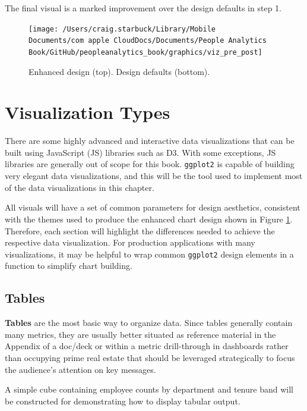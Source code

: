 \documentclass[
]{book}
\begin{document}
The final visual is a marked improvement over the design defaults in step 1.

\begin{figure}

{\centering \texttt{[image: /Users/craig.starbuck/Library/Mobile Documents/com~apple~CloudDocs/Documents/People Analytics Book/GitHub/peopleanalytics\_book/graphics/viz\_pre\_post]} 

}

\caption{Enhanced design (top). Design defaults (bottom).}\label{fig:pre-post-declutter}
\end{figure}

\hypertarget{visualization-types}{%
\section{Visualization Types}\label{visualization-types}}

There are some highly advanced and interactive data visualizations that can be built using JavaScript (JS) libraries such as D3. With some exceptions, JS libraries are generally out of scope for this book. \texttt{ggplot2} is capable of building very elegant data visualizations, and this will be the tool used to implement most of the data visualizations in this chapter.

All visuals will have a set of common parameters for design aesthetics, consistent with the themes used to produce the enhanced chart design shown in Figure \ref{fig:pre-post-declutter}. Therefore, each section will highlight the differences needed to achieve the respective data visualization. For production applications with many visualizations, it may be helpful to wrap common \texttt{ggplot2} design elements in a function to simplify chart building.

\hypertarget{tables}{%
\subsection{Tables}\label{tables}}

\textbf{Tables} are the most basic way to organize data. Since tables generally contain many metrics, they are usually better situated as reference material in the Appendix of a doc/deck or within a metric drill-through in dashboards rather than occupying prime real estate that should be leveraged strategically to focus the audience's attention on key messages.

A simple cube containing employee counts by department and tenure band will be constructed for demonstrating how to display tabular output.
\end{document}
